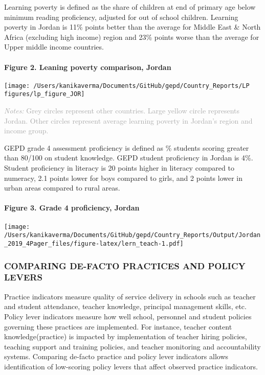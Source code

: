 \documentclass[twocolumn]{article}
\let\oldparagraph\paragraph
\renewcommand{\paragraph}[1]{\oldparagraph{#1}\mbox{}}
\begin{document}
Learning poverty is defined as the share of children at end of primary
age below minimum reading proficiency, adjusted for out of school
children. Learning poverty in Jordan is 11\% points better than the
average for Middle East \& North Africa (excluding high income) region
and 23\% points worse than the average for Upper middle income
countries.

\hypertarget{figure-2.-leaning-poverty-comparison-jordan}{%
\paragraph{Figure 2. Leaning poverty comparison,
Jordan}\label{figure-2.-leaning-poverty-comparison-jordan}}

\texttt{[image: /Users/kanikaverma/Documents/GitHub/gepd/Country\_Reports/LP figures/lp\_figure\_JOR]}

{\scriptsize
    \textcolor{darkgray}{\textit{Notes:} Grey circles represent other countries. Large yellow circle represents Jordan. Other circles represent average learning poverty in Jordan's region and income group.}
  }

GEPD grade 4 assessment proficiency is defined as \% students scoring
greater than 80/100 on student knowledge. GEPD student proficiency in
Jordan is 4\%. Student proficiency in literacy is 20 points higher in
literacy compared to numeracy, 2.1 points lower for boys compared to
girls, and 2 points lower in urban areas compared to rural areas.

\hypertarget{figure-3.-grade-4-proficiency-jordan}{%
\paragraph{Figure 3. Grade 4 proficiency,
Jordan}\label{figure-3.-grade-4-proficiency-jordan}}

\texttt{[image: /Users/kanikaverma/Documents/GitHub/gepd/Country\_Reports/Output/Jordan\_2019\_4Pager\_files/figure-latex/lern\_teach-1.pdf]}

\hypertarget{comparing-de-facto-practices-and-policy-levers}{%
\subsubsection{\texorpdfstring{\textbf{COMPARING DE-FACTO PRACTICES AND
POLICY
LEVERS}}{COMPARING DE-FACTO PRACTICES AND POLICY LEVERS}}\label{comparing-de-facto-practices-and-policy-levers}}

Practice indicators measure quality of service delivery in schools such
as teacher and student attendance, teacher knowledge, principal
management skills, etc. Policy lever indicators measure how well school,
personnel and student policies governing these practices are
implemented. For instance, teacher content knowledge(practice) is
impacted by implementation of teacher hiring policies, teaching support
and training policies, and teacher monitoring and accountability
systems. Comparing de-facto practice and policy lever indicators allows
identification of low-scoring policy levers that affect observed
practice indicators.
\end{document}
